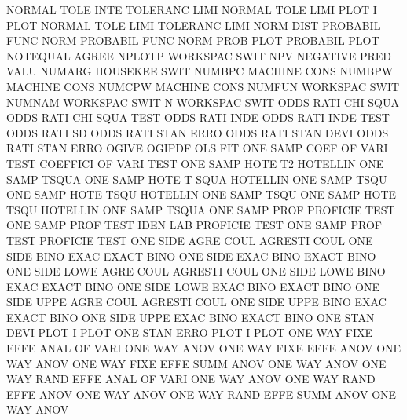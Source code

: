 NORMAL   TOLE INTE                      TOLERANC LIMI
NORMAL   TOLE LIMI PLOT                 I        PLOT
NORMAL   TOLE LIMI                      TOLERANC LIMI
NORM     DIST                           PROBABIL FUNC
NORM                                    PROBABIL FUNC
NORM     PROB PLOT                      PROBABIL PLOT
NOTEQUAL                                AGREE
NPLOTP                                  WORKSPAC SWIT
NPV                                     NEGATIVE PRED VALU
NUMARG                                  HOUSEKEE SWIT
NUMBPC                                  MACHINE  CONS
NUMBPW                                  MACHINE  CONS
NUMCPW                                  MACHINE  CONS
NUMFUN                                  WORKSPAC SWIT
NUMNAM                                  WORKSPAC SWIT
N                                       WORKSPAC SWIT
ODDS     RATI CHI  SQUA                 ODDS     RATI CHI  SQUA TEST
ODDS     RATI INDE                      ODDS     RATI INDE TEST
ODDS     RATI SD                        ODDS     RATI STAN ERRO
ODDS     RATI STAN DEVI                 ODDS     RATI STAN ERRO
OGIVE                                   OGIPDF
OLS                                     FIT
ONE      SAMP COEF OF   VARI TEST       COEFFICI OF   VARI TEST
ONE      SAMP HOTE T2                   HOTELLIN ONE  SAMP TSQUA
ONE      SAMP HOTE T    SQUA            HOTELLIN ONE  SAMP TSQU
ONE      SAMP HOTE TSQU                 HOTELLIN ONE  SAMP TSQU
ONE      SAMP HOTE TSQU                 HOTELLIN ONE  SAMP TSQUA
ONE      SAMP PROF                      PROFICIE TEST
ONE      SAMP PROF TEST IDEN LAB        PROFICIE TEST
ONE      SAMP PROF TEST                 PROFICIE TEST
ONE      SIDE AGRE COUL                 AGRESTI  COUL
ONE      SIDE BINO EXAC                 EXACT    BINO
ONE      SIDE EXAC BINO                 EXACT    BINO
ONE      SIDE LOWE AGRE COUL            AGRESTI  COUL
ONE      SIDE LOWE BINO EXAC            EXACT    BINO
ONE      SIDE LOWE EXAC BINO            EXACT    BINO
ONE      SIDE UPPE AGRE COUL            AGRESTI  COUL
ONE      SIDE UPPE BINO EXAC            EXACT    BINO
ONE      SIDE UPPE EXAC BINO            EXACT    BINO
ONE      STAN DEVI PLOT                 I        PLOT
ONE      STAN ERRO PLOT                 I        PLOT
ONE      WAY  FIXE EFFE ANAL OF   VARI  ONE      WAY  ANOV
ONE      WAY  FIXE EFFE ANOV            ONE      WAY  ANOV
ONE      WAY  FIXE EFFE SUMM ANOV       ONE      WAY  ANOV
ONE      WAY  RAND EFFE ANAL OF   VARI  ONE      WAY  ANOV
ONE      WAY  RAND EFFE ANOV            ONE      WAY  ANOV
ONE      WAY  RAND EFFE SUMM ANOV       ONE      WAY  ANOV
